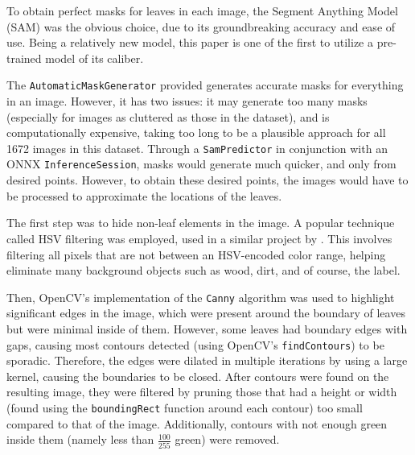 \documentclass[final,5p,times,twocolumn,authoryear]{elsarticle}
\begin{document}
To obtain perfect masks for leaves in each image, the Segment Anything Model (SAM) \citep{kirillov2023segment} was the obvious choice, due to its groundbreaking accuracy and ease of use. Being a relatively new model, this paper is one of the first to utilize a pre-trained model of its caliber.

The \verb|AutomaticMaskGenerator| provided generates accurate masks for everything in an image. However, it has two issues: it may generate too many masks (especially for images as cluttered as those in the dataset), and is computationally expensive, taking too long to be a plausible approach for all 1672 images in this dataset. Through a \verb|SamPredictor| in conjunction with an ONNX \citep{bai2019onnx} \verb|InferenceSession|, masks would generate much quicker, and only from desired points. However, to obtain these desired points, the images would have to be processed to approximate the locations of the leaves.

The first step was to hide non-leaf elements in the image. A popular technique called HSV filtering was employed, used in a similar project by \cite{szachowicz2021komatsuna}. This involves filtering all pixels that are not between an HSV-encoded color range, helping eliminate many background objects such as wood, dirt, and of course, the label.

Then, OpenCV's implementation of the \verb|Canny| algorithm was used to highlight significant edges in the image, which were present around the boundary of leaves but were minimal inside of them. However, some leaves had boundary edges with gaps, causing most contours detected (using OpenCV's \verb|findContours|) to be sporadic. Therefore, the edges were dilated in multiple iterations by using a large kernel, causing the boundaries to be closed. After contours were found on the resulting image, they were filtered by pruning those that had a height or width (found using the \verb|boundingRect| function around each contour) too small compared to that of the image. Additionally, contours with not enough green inside them (namely less than $\frac{100}{255}$ green) were removed.
\end{document}
